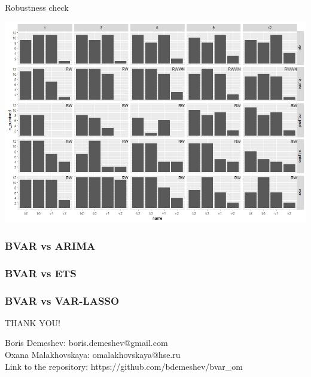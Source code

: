 \documentclass{beamer} %
\begin{document}
\begin{frame}{Robustness check}
\begin{adjustwidth}{-1.5em}{-1.5em}
\vspace{-5mm}
\includegraphics[scale=0.42]{model_selection.jpeg}
\end{adjustwidth}
\end{frame}

\begin{frame}
\frametitle{BVAR vs ARIMA}

\end{frame}


\begin{frame}
\frametitle{BVAR vs ETS}

\end{frame}

\begin{frame}
\frametitle{BVAR vs VAR-LASSO}

\end{frame}

%
%
%




\begin{frame}%
\begin{center}
THANK YOU!
\vspace{1cm}
\end{center}
Boris Demeshev: boris.demeshev@gmail.com\\
Oxana Malakhovskaya: omalakhovskaya@hse.ru\\
Link to the repository: https://github.com/bdemeshev/bvar\_om
\end{frame}
\end{document}
